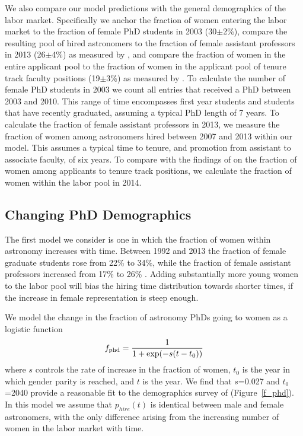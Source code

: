 \documentclass[modern]{aastex62}
\begin{document}
We also compare our model predictions with the general demographics of the labor market. Specifically we anchor the fraction of women entering the labor market to the fraction of female PhD students in 2003 (30$\pm$2\%), compare the resulting pool of hired astronomers to the fraction of female assistant professors in 2013 (26$\pm$4\%) as measured by \citet{hug14}, and compare the fraction of women in the entire applicant pool to the fraction of women in the applicant pool of tenure track faculty positions (19$\pm$3\%) as measured by \citet{tho15}. To calculate the number of female PhD students in 2003 we count all entries that received a PhD between 2003 and 2010. This range of time encompasses first year students and students that have recently graduated, assuming a typical PhD length of 7 years. To calculate the fraction of female assistant professors in 2013, we measure the fraction of women among astronomers hired between 2007 and 2013 within our model. This assumes a typical time to tenure, and promotion from assistant to associate faculty, of six years. To compare with the findings of \citet{tho15} on the fraction of women among applicants to tenure track positions, we calculate the fraction of women within the labor pool in 2014. 

\subsection{Changing PhD Demographics}
The first model we consider is one in which the fraction of women within astronomy increases with time. Between 1992 and 2013 the fraction of female graduate students rose from 22\% to 34\%, while the fraction of female assistant professors increased from 17\% to 26\% \citep{hug14}. Adding substantially more young women to the labor pool will bias the hiring time distribution towards shorter times, if the increase in female representation is steep enough.

We model the change in the fraction of astronomy PhDs going to women as a logistic function
\begin{equation}
f_{\rm phd} = \frac{1}{1+\exp (-s(t-t_0))}\\
\end{equation}
where $s$ controls the rate of increase in the fraction of women, $t_0$ is the year in which gender parity is reached, and $t$ is the year. We find that $s$=0.027 and $t_0$=2040 provide a reasonable fit to the demographics survey of \citet{hug14} (Figure~\ref{f_phd}). In this model we assume that $p_{hire}(t)$ is identical between male and female astronomers, with the only difference arising from the increasing number of women in the labor market with time. 
\end{document}
